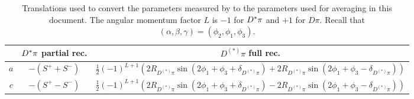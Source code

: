 \begin{table}
  \begin{center} 
    \caption{
      Translations used to convert the parameters measured by \belle
      to the parameters used for averaging in this document.
      The angular momentum factor $L$ is $-1$ for $D^*\pi$ and $+1$ for $D\pi$.
      Recall that $\left( \alpha, \beta, \gamma \right) = \left( \phi_2, \phi_1, \phi_3 \right)$.
    }
    \vspace{0.2cm}
    \setlength{\tabcolsep}{0.0pc}
    \begin{tabular*}{\textwidth}{@{\extracolsep{\fill}}ccc} \hline 
        & $D^*\pi$ partial rec. & $D^{(*)}\pi$ full rec. \\
        \hline
        $a$ & $- (S^+ + S^-)$ &
        $\frac{1}{2} (-1)^{L+1}
        \left(
          2 R_{D^{(*)}\pi} \sin( 2\phi_1 + \phi_3 + \delta_{D^{(*)}\pi} ) + 
          2 R_{D^{(*)}\pi} \sin( 2\phi_1 + \phi_3 - \delta_{D^{(*)}\pi} )
        \right)$ \\
        $c$ & $- (S^+ - S^-)$ & 
        $\frac{1}{2} (-1)^{L+1}
        \left(
          2 R_{D^{(*)}\pi} \sin( 2\phi_1 + \phi_3 + \delta_{D^{(*)}\pi} ) -
          2 R_{D^{(*)}\pi} \sin( 2\phi_1 + \phi_3 - \delta_{D^{(*)}\pi} )
        \right)$ \\
        \hline 
      \end{tabular*}
    \label{tab:cp_uta:notations:non_cp:dstarpi2}
  \end{center}
\end{table}

\label{sec:cp_uta:notations:non_cp:radiative}

